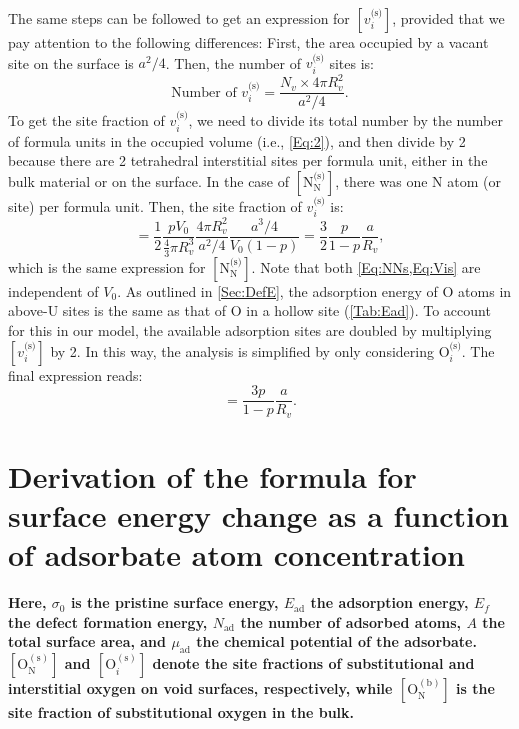 \documentclass[preprint,12pt,sort&compress]{elsarticle}
\newcommand{\?}{\stackrel{?}{=}}
\providecommand{\DIFaddtex}[1]{{\bf #1}} %
\providecommand{\DIFaddbegin}{\protect\color{blue}} %
\providecommand{\DIFadd}[1]{\texorpdfstring{\DIFaddtex{#1}}{#1}} %
\newcommand{\DIFaddincludegraphics}[2][]{{\color{blue}\fbox{\DIFOincludegraphics[#1]{#2}}}} %
\DeclareRobustCommand{\DIFaddbegin}{\DIFOaddbegin \let\includegraphics\DIFaddincludegraphics} %
\begin{document}
The same steps can be followed to get an expression for $[v_i^\text{(s)}]$, provided that we pay attention to the following differences: First, the area occupied by a vacant site on the surface is $a^2/4$. Then, the number of $v_i^\text{(s)}$ sites is:
\begin{equation}
\text{Number of } v_i^\text{(s)} = \frac{ N_v \times 4 \pi R_v^2 }{ a^2 / 4 }.
\end{equation}
To get the site fraction of $v_i^\text{(s)}$, we need to divide its total number by the number of formula units in the occupied volume (i.e., \cref{Eq:2}), and then divide by 2 because there are 2 tetrahedral interstitial sites per formula unit, either in the bulk material or on the surface. In the case of $[ \text{N}_\text{N}^\text{(s)} ]$, there was one N atom (or site) per formula unit. Then, the site fraction of $v_i^\text{(s)}$ is: 
\begin{equation}
[ v_i^\text{(s)} ] = \frac{1}{2} \frac{p V_0}{ \frac{4}{3} \pi R_v^3 } \frac{4 \pi R_v^2}{ a^2/4}  \frac{ a^3/4 }{ V_0 (1 - p) } = \frac{3}{2} \frac{p}{1-p} \frac{a}{R_v},
\label{Eq:Vis}
\end{equation}
which is the same expression for $[ \text{N}_\text{N}^\text{(s)} ]$. Note that both \cref{Eq:NNs,Eq:Vis} are independent of $V_0$. As outlined in \cref{Sec:DefE}, the adsorption energy of O atoms in above-U sites is the same as that of O in a hollow site (\cref{Tab:Ead}). To account for this in our model, the available adsorption sites are doubled by multiplying $[ v_i^\text{(s)} ]$ by 2. In this way, the analysis is simplified by only considering $\text{O}_i^{\text{(s)}}$. The final expression reads:
\begin{equation}
[v_i^{\text{(s)}}] = \frac{3p}{1-p} \frac{a}{R_v}.
\end{equation}

\section{Derivation of the formula for surface energy change as a function of adsorbate atom concentration}
\label{App2}

\DIFaddbegin \DIFadd{Here, $\sigma_0$ is the pristine surface energy, $E_\text{ad}$ the adsorption energy, $E_f$ the defect formation energy, $N_\text{ad}$ the number of adsorbed atoms, $A$ the total surface area, and $\mu_\text{ad}$ the chemical potential of the adsorbate. $[\text{O}_\text{N}^{(\text{s})}]$ and $[\text{O}_i^{(\text{s})}]$ denote the site fractions of substitutional and interstitial oxygen on void surfaces, respectively, while $[\text{O}_\text{N}^{(\text{b})}]$ is the site fraction of substitutional oxygen in the bulk.
}
\end{document}
